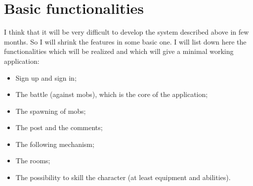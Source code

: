 	\section{Basic functionalities}
	I think that it will be very difficult to develop the system described above in few months. So I will shrink the features in some basic one. I will list down here the functionalities which will be realized and which will give a minimal working application:
	\begin{itemize}
		\item Sign up and sign in;
	 	\item The battle (against mobs), which is the core of the application;
	 	\item The spawning of mobs;
	 	\item The post and the comments;
	 	\item The following mechanism;
	 	\item The rooms;
	 	\item The possibility to skill the character (at least equipment and abilities).
	\end{itemize} 